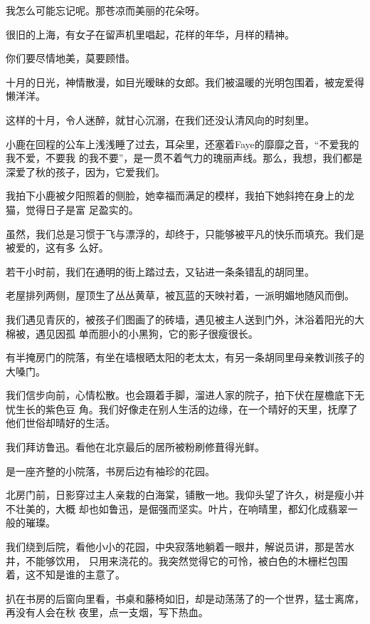 \documentclass[12pt,a4paper]{article}
\begin{document}
		我怎么可能忘记呢。那苍凉而美丽的花朵呀。

		很旧的上海，有女子在留声机里唱起，花样的年华，月样的精神。


		你们要尽情地美，莫要顾惜。

	\endwriting



		十月的日光，神情散漫，如目光暧昧的女郎。我们被温暖的光明包围着，被宠爱得懒洋洋。

		这样的十月，令人迷醉，就甘心沉溺，在我们还没认清风向的时刻里。

		小鹿在回程的公车上浅浅睡了过去，耳朵里，还塞着Faye的靡靡之音，“不爱我的我不爱，不要我
	的我不要”，是一贯不着气力的瑰丽声线。那么，我想，我们都是深爱了秋的孩子，因为，它爱我们。

		我拍下小鹿被夕阳照着的侧脸，她幸福而满足的模样，我拍下她斜挎在身上的龙猫，觉得日子是富
	足盈实的。

		虽然，我们总是习惯于飞与漂浮的，却终于，只能够被平凡的快乐而填充。我们是被爱的，这有多
	么好。


		若干小时前，我们在通明的街上踏过去，又钻进一条条错乱的胡同里。

		老屋排列两侧，屋顶生了丛丛黄草，被瓦蓝的天映衬着，一派明媚地随风而倒。

		我们遇见青灰的，被孩子们图画了的砖墙，遇见被主人送到门外，沐浴着阳光的大棉被，遇见因孤
	单而胆小的小黑狗，它的影子很瘦很长。

		有半掩房门的院落，有坐在墙根晒太阳的老太太，有另一条胡同里母亲教训孩子的大嗓门。

		我们信步向前，心情松散。也会蹑着手脚，溜进人家的院子，拍下伏在屋檐底下无忧生长的紫色豆
	角。我们好像走在别人生活的边缘，在一个晴好的天里，抚摩了他们世俗却晴好的生活。


		我们拜访鲁迅。看他在北京最后的居所被粉刷修葺得光鲜。

		是一座齐整的小院落，书房后边有袖珍的花园。

		北房门前，日影穿过主人亲栽的白海棠，铺散一地。我仰头望了许久，树是瘦小并不壮美的，大概
	却也如鲁迅，是倔强而坚实。叶片，在响晴里，都幻化成翡翠一般的璀璨。

		我们绕到后院，看他小小的花园，中央寂落地躺着一眼井，解说员讲，那是苦水井，不能够饮用，
	只用来浇花的。我突然觉得它的可怜，被白色的木栅栏包围着，这不知是谁的主意了。

		扒在书房的后窗向里看，书桌和藤椅如旧，却是动荡荡了的一个世界，猛士离席，再没有人会在秋
	夜里，点一支烟，写下热血。
\end{document}
